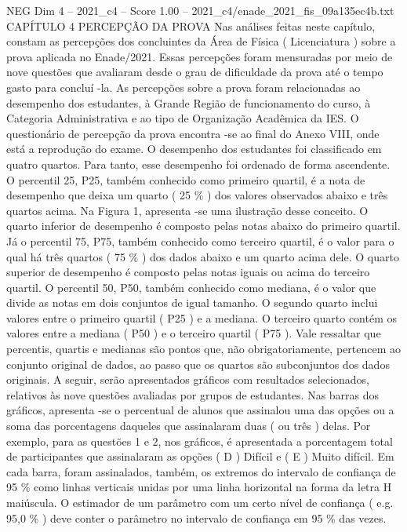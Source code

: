 \begin{textsample}{NEG Dim 4 – 2021\_c4 – Score 1.00 – 2021\_c4/enade\_2021\_fis\_09a135ec4b.txt}  \label{ex:f4_neg_225}
CAPÍTULO 4 PERCEPÇÃO DA PROVA Nas análises feitas neste capítulo, constam as percepções dos concluintes da Área de Física ( Licenciatura ) sobre a prova aplicada no Enade/2021.
Essas percepções foram mensuradas por meio de nove questões que avaliaram desde o grau de dificuldade da prova até o tempo gasto para concluí -la.
As percepções sobre a prova foram relacionadas ao desempenho dos estudantes, à Grande Região de funcionamento do curso, à Categoria Administrativa e ao tipo de Organização Acadêmica da IES.
O questionário de percepção da prova encontra -se ao final do Anexo VIII, onde está a reprodução do exame.
O desempenho dos estudantes foi classificado em quatro quartos.
Para tanto, esse desempenho foi ordenado de forma ascendente.
O percentil 25, P25, também conhecido como primeiro quartil, é a nota de desempenho que deixa um quarto ( 25 \% ) dos valores observados abaixo e três quartos acima.
Na Figura 1, apresenta -se uma ilustração desse conceito.
O quarto inferior de desempenho é composto pelas notas abaixo do primeiro quartil.
Já o percentil 75, P75, também conhecido como terceiro quartil, é o valor para o qual há três quartos ( 75 \% ) dos dados abaixo e um quarto acima dele.
O quarto superior de desempenho é composto pelas notas iguais ou acima do terceiro quartil.
O percentil 50, P50, também conhecido como mediana, é o valor que divide as notas em dois conjuntos de igual tamanho.
O segundo quarto inclui valores entre o primeiro quartil ( P25 ) e a mediana.
O terceiro quarto contém os valores entre a mediana ( P50 ) e o terceiro quartil ( P75 ).
Vale ressaltar que percentis, quartis e medianas são pontos que, não obrigatoriamente, pertencem ao conjunto original de dados, ao passo que os quartos são subconjuntos dos dados originais.
A seguir, serão apresentados gráficos com resultados selecionados, relativos às nove questões avaliadas por grupos de estudantes.
Nas barras dos gráficos, apresenta -se o percentual de alunos que assinalou uma das opções ou a soma das porcentagens daqueles que assinalaram duas ( ou três ) delas.
Por exemplo, para as questões 1 e 2, nos gráficos, é apresentada a porcentagem total de participantes que assinalaram as opções ( D ) Difícil e ( E ) Muito difícil.
Em cada barra, foram assinalados, também, os extremos do intervalo de confiança de 95 \% como linhas verticais unidas por uma linha horizontal na forma da letra H maiúscula.
O estimador de um parâmetro com um certo nível de confiança ( e.g. 95,0 \% ) deve conter o parâmetro no intervalo de confiança em 95 \% das vezes.

\end{textsample}
